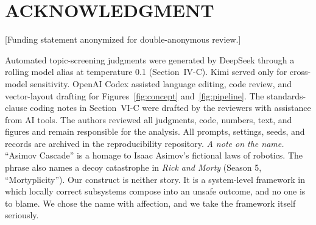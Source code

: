 \documentclass[letterpaper,9pt,conference]{ieeeconf}
\begin{document}
\section*{ACKNOWLEDGMENT}

[Funding statement anonymized for double-anonymous review.]

Automated topic-screening judgments were generated by DeepSeek through a rolling model alias at temperature 0.1 (Section~IV-C). Kimi served only for cross-model sensitivity. OpenAI Codex assisted language editing, code review, and vector-layout drafting for Figures~\ref{fig:concept} and~\ref{fig:pipeline}. The standards-clause coding notes in Section~VI-C were drafted by the reviewers with assistance from AI tools. The authors reviewed all judgments, code, numbers, text, and figures and remain responsible for the analysis. All prompts, settings, seeds, and records are archived in the reproducibility repository. \textit{A note on the name.} ``Asimov Cascade'' is a homage to Isaac Asimov's fictional laws of robotics. The phrase also names a decoy catastrophe in \textit{Rick and Morty} (Season 5, ``Mortyplicity''). Our construct is neither story. It is a system-level framework in which locally correct subsystems compose into an unsafe outcome, and no one is to blame. We chose the name with affection, and we take the framework itself seriously.
\end{document}
